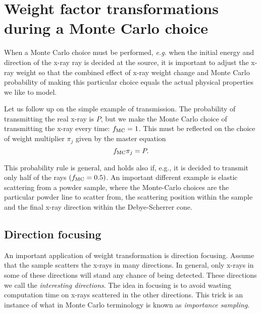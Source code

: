 \section{Weight factor transformations during a Monte Carlo
 choice}
When a Monte Carlo choice must be performed, {\em e.g.} when the
initial energy and direction of the x-ray ray is decided at the source,
it is important to adjust the x-ray weight so that the combined
effect of x-ray weight change and Monte Carlo probability
of making this particular choice
equals the actual physical properties we like to model.

Let us follow up on the simple example of transmission.
The probability of transmitting the real x-ray is $P$, but we make
the Monte Carlo choice of transmitting the x-ray every time:
$f_{\rm MC}=1$. This must be reflected on the choice of weight multiplier
$\pi_j$ given by the master equation
\begin{equation} \label{probrule}
f_{\rm MC} \pi_j = P .
\end{equation}

This probability rule is general, and holds also if, e.g., it is decided to
transmit only half of the rays $(f_{\rm MC}=0.5)$.
An important different example
is elastic scattering from a powder sample,
where the Monte-Carlo choices are the particular powder line to scatter from,
the scattering position within the sample and the final x-ray direction
within the Debye-Scherrer cone.

\subsection{Direction focusing}
\label{s:focus}
An important application of weight transformation is direction focusing.
Assume that the sample scatters the x-rays in many directions.
In general, only x-rays in some of these directions will
stand any chance of being detected. These directions we call
the {\em interesting directions}.
The idea in focusing is to avoid wasting computation time on
x-rays scattered in the other directions.
This trick is an instance of what in Monte Carlo terminology
is known as {\em importance sampling}. %

